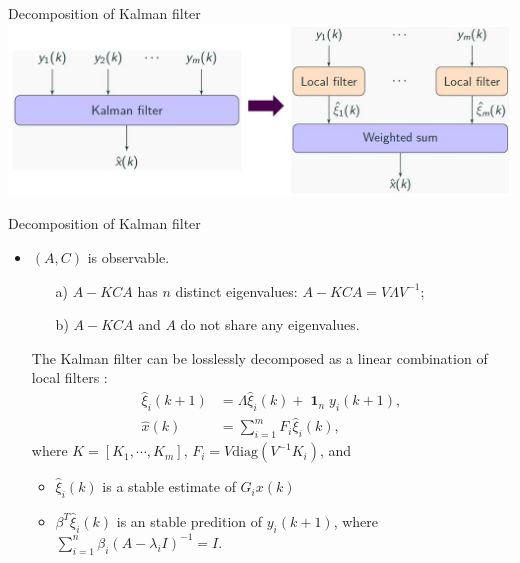 \documentclass[10pt]{beamer}
\newcommand{\diag}{\text{diag}}
\DeclareMathOperator{\1}{\textbf{1}}
\begin{document}
	  \begin{frame}{Decomposition of Kalman filter}
	    \centering
	    \includegraphics[width=1.0\textwidth]{pic/decomp}
	  \end{frame}

	  \begin{frame}{Decomposition of Kalman filter}
	    \begin{itemize}
	      \item $(A,C)$ is observable.
		\begin{itemize}
		  \item[a)] $A-KCA$ has {\color{thupurple} $n$ distinct} eigenvalues: $A-KCA=V\Lambda V^{-1}$;
		  \item[b)] $A-KCA$ and $A$ {\color{thupurple}do not share} any eigenvalues.
		\end{itemize}
		\begin{theorem}
		  
		The Kalman filter can be losslessly decomposed as a linear combination of local filters :
		\begin{align*}
		  \hat \xi_i(k+1)&=\Lambda\hat \xi_i(k)+\1_ny_i(k+1),\\
		  \hat x(k)&=\sum_{i=1}^m F_i\hat \xi_i(k),
		\end{align*}
		where $K=[K_1,\cdots,K_m]$, $F_i=V \diag(V^{-1}K_i)$, and 
		\begin{itemize}
		  \item $\hat\xi_i(k)$ is a stable estimate of $G_ix(k)$
		  \item $\beta^T\hat\xi_i(k)$ is an stable predition of $y_i(k+1)$, where $\sum_{i=1}^n \beta_i(A-\lambda_i I)^{-1}=I$.
		\end{itemize}	
		\end{theorem}
	    \end{itemize}
	  \end{frame}
\end{document}

